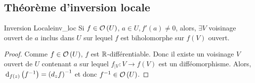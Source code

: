 \documentclass{cours}
\begin{document}
\subsection{Théorème d'inversion locale}
\begin{théorème}{Inversion Locale}{inv_loc}
    Si $f\in \mathcal{O}\left(U\right)$, $a \in U, f'\left(a\right) \neq 0$, alors, $\exists V$ voisinage ouvert de $a$ inclus dans $U$ sur lequel $f$ est biholomorphe sur $f\left(V\right)$ ouvert. 
\end{théorème}
\begin{proof}
    Comme $f\in \mathcal{O}\left(U\right)$, $f$ est $\mathbb{R}$-différentiable. Donc il existe un voisinage $V$ ouvert de $U$ contenant $a$ sur lequel $f_{\mid V} : V \to f\left(V\right)$ est un difféomorphisme. Alors, ${\rm \, d}_{f\left(z\right)}\left(f^{-1}\right) = \left(d_{z} f\right)^{-1}$ et donc $f^{-1} \in \mathcal{O}\left(U\right)$.
\end{proof}
\end{document}
